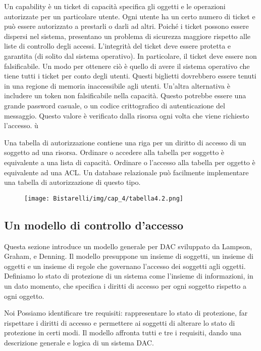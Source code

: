 Un capability è un ticket di capacità specifica gli oggetti e le operazioni autorizzate per un particolare utente. Ogni utente ha un certo numero di ticket e può essere autorizzato a prestarli o darli ad altri. Poiché i ticket possono essere dispersi nel sistema, presentano un problema di sicurezza maggiore rispetto alle liste di controllo degli accessi. L'integrità del ticket deve essere protetta e garantita (di solito dal sistema operativo). In particolare, il ticket deve essere non falsificabile. Un modo per ottenere ciò è quello di avere il sistema operativo che tiene tutti i ticket per conto degli utenti. Questi biglietti dovrebbero essere tenuti in una regione di memoria inaccessibile agli utenti. Un'altra alternativa è includere un token non falsificabile nella capacità. Questo potrebbe essere una grande password casuale, o un codice crittografico di autenticazione del messaggio. Questo valore è verificato dalla risorsa ogni volta che viene richiesto l'accesso. ù

\singlespacing

Una tabella di autorizzazione contiene una riga per un diritto di accesso di un soggetto ad una risorsa. Ordinare o accedere alla tabella per soggetto è equivalente a una lista di capacità. Ordinare o l'accesso alla tabella per oggetto è equivalente ad una ACL. Un database relazionale può facilmente implementare una tabella di autorizzazione di questo tipo.

\begin{figure}[H]
	\centering
    \texttt{[image: Bistarelli/img/cap\_4/tabella4.2.png]}
\end{figure}

\newpage
\subsection{Un modello di controllo d'accesso}
Questa sezione introduce un modello generale per DAC sviluppato da Lampson, Graham, e Denning. Il modello presuppone un insieme di soggetti, un insieme di oggetti e un insieme di regole che governano l'accesso dei soggetti agli oggetti. Definiamo lo stato di protezione di un sistema come l'insieme di informazioni, in un dato momento, che specifica i diritti di accesso per ogni soggetto rispetto a ogni oggetto.

\singlespacing

Noi Possiamo identificare tre requisiti: rappresentare lo stato di protezione, far rispettare i diritti di accesso e permettere ai soggetti di alterare lo stato di protezione in certi modi. Il modello affronta tutti e tre i requisiti, dando una descrizione generale e logica di un sistema DAC.

